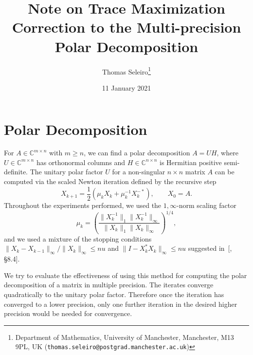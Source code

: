 \documentclass[10pt, A4paper]{article}
\newcommand{\mxn}{m \times n}
\newcommand{\nxn}{n \times n}
\begin{document}
\title{Note on Trace Maximization Correction to the Multi-precision
Polar Decomposition}
\author{Thomas Seleiro\thanks
	{Department of Mathematics, University of Manchester,
	Manchester, M13 9PL, UK
	(\texttt{thomas.seleiro@postgrad.manchester.ac.uk})}}
\date{11 January 2021}
\maketitle


\section{Polar Decomposition}

For $A \in \mathbb{C}^{\mxn}$ with $m \geq n$, we can find a polar 
decomposition $A =
UH$, where $U \in \mathbb{C}^{\mxn}$ has orthonormal columns and $H \in
\mathbb{C}^{\nxn}$ is Hermitian positive semi-definite.
The unitary polar factor $U$ for a non-singular $\nxn$ matrix $A$ can 
be computed
via the scaled Newton iteration defined by the recursive step
$$X_{k+1} = \dfrac{1}{2} (\mu_k X_k + \mu_k^{-1} X_k^{-*}),
\qquad X_0 = A.$$
Throughout the experiments performed, we used the $1,\infty$-norm
scaling factor
$$\mu_k = \left( \dfrac{\|X_k^{-1}\|_1 \|X_k^{-1}\|_\infty}
{\|X_k\|_1 \|X_k\|_\infty}\right)^{1/4},$$
and we used a mixture of the stopping conditions
$\|X_k - X_{k-1}\|_\infty / \|X_k\|_\infty \leq nu$
and
$\|I - X_k^*X_k\|_\infty \leq nu$ suggested in~{[\citealp{high2008},
\S8.4].}

We try to evaluate the effectiveness of using this method for computing
the polar decomposition of a matrix in multiple precision.
The iterates converge quadratically to the unitary polar factor.
Therefore once the iteration has converged to a lower precision, only
one further iteration in the desired higher precision would be needed
for convergence.
\end{document}
